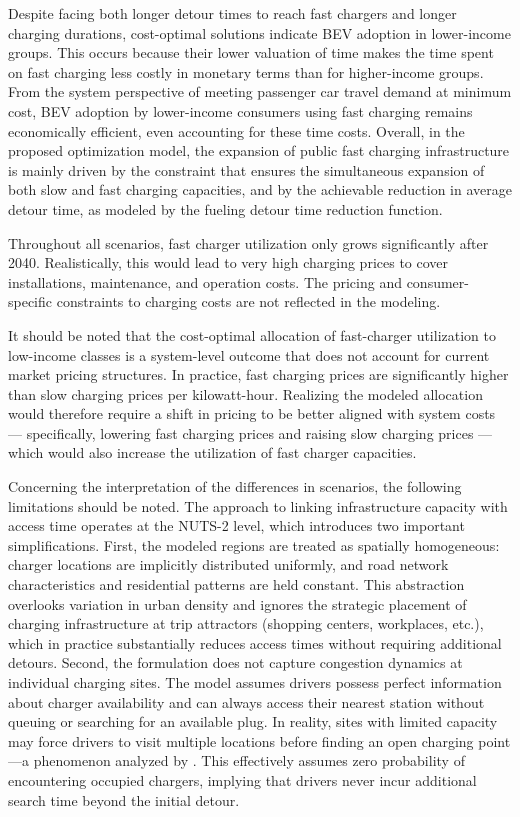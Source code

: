 Despite facing both longer detour times to reach fast chargers and longer charging durations, cost-optimal solutions indicate \ac{BEV} adoption in lower-income groups. This occurs because their lower valuation of time makes the time spent on fast charging less costly in monetary terms than for higher-income groups. From the system perspective of meeting passenger car travel demand at minimum cost, \ac{BEV} adoption by lower-income consumers using fast charging remains economically efficient, even accounting for these time costs. Overall, in the proposed optimization model, the expansion of public fast charging infrastructure is mainly driven by the constraint that ensures the simultaneous expansion of both slow and fast charging capacities, and by the achievable reduction in average detour time, as modeled by the fueling detour time reduction function.

Throughout all scenarios, fast charger utilization only grows significantly after 2040. Realistically, this would lead to very high charging prices to cover installations, maintenance, and operation costs. The pricing and consumer-specific constraints to charging costs are not reflected in the modeling. 

It should be noted that the cost-optimal allocation of fast-charger utilization to low-income classes is a system-level outcome that does not account for current market pricing structures. In practice, fast charging prices are significantly higher than slow charging prices per kilowatt-hour. Realizing the modeled allocation would therefore require a shift in pricing to be better aligned with system costs — specifically, lowering fast charging prices and raising slow charging prices — which would also increase the utilization of fast charger capacities.

Concerning the interpretation of the differences in scenarios, the following limitations should be noted. The approach to linking infrastructure capacity with access time operates at the NUTS-2 level, which introduces two important simplifications.
First, the modeled regions are treated as spatially homogeneous: charger locations are implicitly distributed uniformly, and road network characteristics and residential patterns are held constant. This abstraction overlooks variation in urban density and ignores the strategic placement of charging infrastructure at trip attractors (shopping centers, workplaces, etc.), which in practice substantially reduces access times without requiring additional detours.
Second, the formulation does not capture congestion dynamics at individual charging sites. The model assumes drivers possess perfect information about charger availability and can always access their nearest station without queuing or searching for an available plug. In reality, sites with limited capacity may force drivers to visit multiple locations before finding an open charging point—a phenomenon analyzed by \cite{WOLBERTUS2021262}. This effectively assumes zero probability of encountering occupied chargers, implying that drivers never incur additional search time beyond the initial detour.

